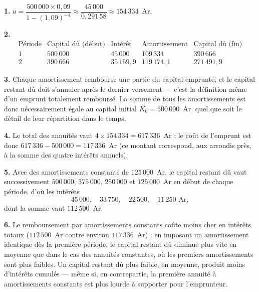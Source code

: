 \begin{corrige}
\textbf{1.} $a = \dfrac{500\,000 \times 0{,}09}{1-(1{,}09)^{-4}}
\approx \dfrac{45\,000}{0{,}291\,58} \approx 154\,334$~Ar.

\textbf{2.}
\[
  \begin{array}{c|cccc}
    \text{Période} & \text{Capital dû (début)} & \text{Intérêt} &
    \text{Amortissement} & \text{Capital dû (fin)} \\
    \hline
    1 & 500\,000 & 45\,000 & 109\,334 & 390\,666 \\
    2 & 390\,666 & 35\,159{,}9 & 119\,174{,}1 & 271\,491{,}9
  \end{array}
\]

\textbf{3.} Chaque amortissement rembourse une partie du capital emprunté,
et le capital restant dû doit s'annuler après le dernier versement — c'est
la définition même d'un emprunt totalement remboursé. La somme de tous les
amortissements est donc nécessairement égale au capital initial
$K_{0} = 500\,000$~Ar, quel que soit le détail de leur répartition dans le
temps.

\textbf{4.} Le total des annuités vaut $4 \times 154\,334 = 617\,336$~Ar ;
le coût de l'emprunt est donc $617\,336-500\,000 = 117\,336$~Ar (ce montant
correspond, aux arrondis près, à la somme des quatre intérêts annuels).

\textbf{5.} Avec des amortissements constants de $125\,000$~Ar, le capital
restant dû vaut successivement $500\,000$, $375\,000$, $250\,000$ et
$125\,000$~Ar en début de chaque période, d'où les intérêts
\[
  45\,000, \quad 33\,750, \quad 22\,500, \quad 11\,250 \text{ Ar},
\]
dont la somme vaut $112\,500$~Ar.

\textbf{6.} Le remboursement par amortissements constants coûte moins cher
en intérêts totaux ($112\,500$~Ar contre environ $117\,336$~Ar) : en
imposant un amortissement identique dès la première période, le capital
restant dû diminue plus vite en moyenne que dans le cas des annuités
constantes, où les premiers amortissements sont plus faibles. Un capital
restant dû plus faible, en moyenne, produit moins d'intérêts cumulés — même
si, en contrepartie, la première annuité à amortissements constants est plus
lourde à supporter pour l'emprunteur.
\end{corrige}

